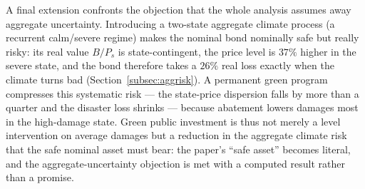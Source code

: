 \documentclass[12pt]{article}
\begin{document}
A final extension confronts the objection that the whole analysis assumes away
aggregate uncertainty. Introducing a two-state aggregate climate process (a
recurrent calm/severe regime) makes the nominal bond nominally safe but really
risky: its real value $B/P_s$ is state-contingent, the price level is $37\%$
higher in the severe state, and the bond therefore takes a $26\%$ real loss
exactly when the climate turns bad (Section~\ref{subsec:aggrisk}). A permanent
green program compresses this systematic risk --- the state-price dispersion
falls by more than a quarter and the disaster loss shrinks --- because
abatement lowers damages most in the high-damage state. Green public investment
is thus not merely a level intervention on average damages but a reduction in
the aggregate climate risk that the safe nominal asset must bear: the paper's
``safe asset'' becomes literal, and the aggregate-uncertainty objection is met
with a computed result rather than a promise.
\end{document}
